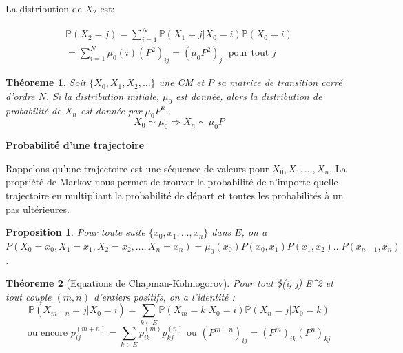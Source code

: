 \documentclass[
]{book}
\newtheorem{theorem}{Théoreme}[chapter]
\newtheorem{proposition}{Proposition}[chapter]
\theoremstyle{definition}
\theoremstyle{definition}
\theoremstyle{definition}
\theoremstyle{remark}
\begin{document}
La distribution de \(X_2\) est:

\begin{align*} 
\mathbb{P}(X_2 = j) = \sum_{i=1}^N \mathbb{P}(X_1 = j | X_0 = i)\mathbb{P}(X_0 = i) \\
=
\sum_{i=1}^N \mu_0(i) (P^2)_{ij}=(\mu_0 P^2)_j\; \text{ pour tout }j
\end{align*}

\begin{theorem}
\protect\hypertarget{thm:unnamed-chunk-48}{}{\label{thm:unnamed-chunk-48} }Soit \(\{X_0, X_1, X_2, \ldots \}\) une CM et \(P\) sa matrice de transition carré d'ordre \(N\). Si la distribution initiale, \(\mu_0\) est donnée, alors la distribution de probabilité de \(X_n\) est donnée par \(\mu_0 P^n\).
\[
X_0 \sim \mu_0 \Longrightarrow X_n \sim \mu_0 P
\]
\end{theorem}

\textbf{Probabilité d'une trajectoire}

Rappelons qu'une trajectoire est une séquence
de valeurs pour \(X_0, X_1,\ldots, X_n\). La propriété de Markov nous permet de trouver la probabilité de n'importe quelle trajectoire en multipliant la probabilité de départ et toutes les probabilités à un pas ultérieures.

\begin{proposition}
\protect\hypertarget{prp:unnamed-chunk-49}{}{\label{prp:unnamed-chunk-49} }Pour toute suite \(\{x_0, x_1, \ldots , x_n\}\) dans \(E\), on a
\(P(X_0 = x_0, X_1 = x_1,X_2 = x_2, \ldots , X_n = x_n) =\mu_0(x_0)P(x_0, x_1)P(x_1, x_2)\ldots P(x_{n−1}, x_n)\).
\end{proposition}

\begin{theorem}[Equations de Chapman-Kolmogorov]
\protect\hypertarget{thm:unnamed-chunk-50}{}{\label{thm:unnamed-chunk-50} {} }Pour tout \$(i, j) \in E\^{}2 et tout couple \((m, n)\) d'entiers positifs, on a l'identité :
\[
\mathbb{P}(X_{m+n} = j|X_0 = i) = \sum_{k\in E}
\mathbb{P}(X_m = k|X_0 = i)\mathbb{P}(X_n = j|X_0 = k)\]
\[\text{ou encore }
p^{(m+n)}_{ij} = \sum_{k \in E} p^{(m)}_{ik} p^{(n)}_{kj} \text{ ou } (P^{m+n})_{ij}=(P^m)_{ik}(P^n)_{kj}\]
\end{theorem}
\end{document}
